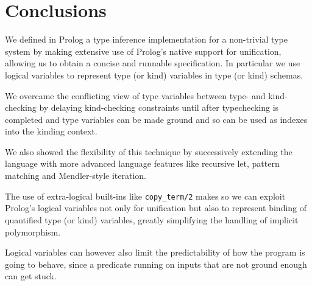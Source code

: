 \documentclass[runningheads,a4paper]{llncs}
\begin{document}
\section{Conclusions}\label{sec:concl}

We defined in Prolog a type inference implementation for a non-trivial
type system by making extensive use of Prolog's native support for
unification, allowing us to obtain a concise and runnable
specification. In particular we use logical variables to
represent type (or kind) variables in type (or kind) schemas.

We overcame the conflicting view of type variables between type- and
kind-checking by delaying kind-checking constraints until after
typechecking is completed and type variables can be made ground and so
can be used as indexes into the kinding context.

We also showed the flexibility of this technique by successively
extending the language with more advanced language features like
recursive let, pattern matching and Mendler-style iteration.

The use of extra-logical built-ins like \verb|copy_term/2| makes so we
can exploit Prolog's logical variables not only for unification but
also to represent binding of quantified type (or kind) variables,
greatly simplifying the handling of implicit polymorphism.

Logical variables can however also limit the predictability of how the
program is going to behave, since a predicate running on inputs that
are not ground enough can get stuck.







\makeatletter
\renewcommand\bibsection{\section*\bibname}
\makeatother


\end{document}
